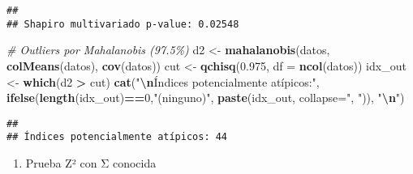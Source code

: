 \documentclass[
]{article}
\newenvironment{Shaded}{\begin{snugshade}}{\end{snugshade}}
\newcommand{\AttributeTok}[1]{\textcolor[rgb]{0.13,0.29,0.53}{#1}}
\newcommand{\CommentTok}[1]{\textcolor[rgb]{0.56,0.35,0.01}{\textit{#1}}}
\newcommand{\DecValTok}[1]{\textcolor[rgb]{0.00,0.00,0.81}{#1}}
\newcommand{\FloatTok}[1]{\textcolor[rgb]{0.00,0.00,0.81}{#1}}
\newcommand{\FunctionTok}[1]{\textcolor[rgb]{0.13,0.29,0.53}{\textbf{#1}}}
\newcommand{\NormalTok}[1]{#1}
\newcommand{\OtherTok}[1]{\textcolor[rgb]{0.56,0.35,0.01}{#1}}
\newcommand{\SpecialCharTok}[1]{\textcolor[rgb]{0.81,0.36,0.00}{\textbf{#1}}}
\newcommand{\StringTok}[1]{\textcolor[rgb]{0.31,0.60,0.02}{#1}}
\providecommand{\tightlist}{%
  \setlength{\itemsep}{0pt}\setlength{\parskip}{0pt}}
\begin{document}
\begin{verbatim}
## 
## Shapiro multivariado p-value: 0.02548
\end{verbatim}

\begin{Shaded}
\begin{Highlighting}[]
\CommentTok{\# Outliers por Mahalanobis (97.5\%)}
\NormalTok{d2  }\OtherTok{\textless{}{-}} \FunctionTok{mahalanobis}\NormalTok{(datos, }\FunctionTok{colMeans}\NormalTok{(datos), }\FunctionTok{cov}\NormalTok{(datos))}
\NormalTok{cut }\OtherTok{\textless{}{-}} \FunctionTok{qchisq}\NormalTok{(}\FloatTok{0.975}\NormalTok{, }\AttributeTok{df =} \FunctionTok{ncol}\NormalTok{(datos))}
\NormalTok{idx\_out }\OtherTok{\textless{}{-}} \FunctionTok{which}\NormalTok{(d2 }\SpecialCharTok{\textgreater{}}\NormalTok{ cut)}
\FunctionTok{cat}\NormalTok{(}\StringTok{"}\SpecialCharTok{\textbackslash{}n}\StringTok{Índices potencialmente atípicos:"}\NormalTok{, }\FunctionTok{ifelse}\NormalTok{(}\FunctionTok{length}\NormalTok{(idx\_out)}\SpecialCharTok{==}\DecValTok{0}\NormalTok{,}\StringTok{"(ninguno)"}\NormalTok{, }\FunctionTok{paste}\NormalTok{(idx\_out, }\AttributeTok{collapse=}\StringTok{", "}\NormalTok{)), }\StringTok{"}\SpecialCharTok{\textbackslash{}n}\StringTok{"}\NormalTok{)}
\end{Highlighting}
\end{Shaded}

\begin{verbatim}
## 
## Índices potencialmente atípicos: 44
\end{verbatim}

\begin{enumerate}
\def\labelenumi{\arabic{enumi})}
\setcounter{enumi}{3}
\tightlist
\item
  Prueba Z² con Σ conocida
\end{enumerate}
\end{document}
